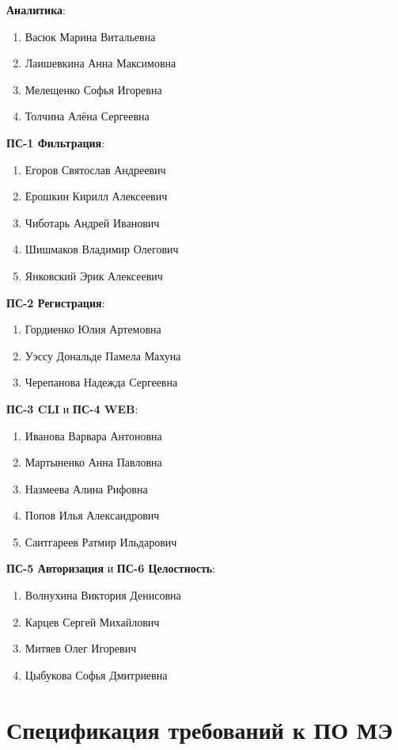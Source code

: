 \documentclass[13pt,a4paper,final]{article}
\begin{document}
	\textbf{Аналитика}:
	\begin{enumerate}
		\item Васюк Марина Витальевна
		\item Лаишевкина Анна Максимовна
		\item Мелещенко Софья Игоревна
		\item Толчина Алёна Сергеевна
	\end{enumerate}
	
	\textbf{ПС-1 Фильтрация}:
	\begin{enumerate}
		\item Егоров Святослав Андреевич
		\item Ерошкин Кирилл Алексеевич
		\item Чиботарь Андрей Иванович
		\item Шишмаков Владимир Олегович
		\item Янковский Эрик Алексеевич
	\end{enumerate}
	
	\textbf{ПС-2 Регистрация}:
	\begin{enumerate}
		\item Гордиенко Юлия Артемовна
		\item Уэссу Дональде Памела Махуна
		\item Черепанова Надежда Сергеевна
	\end{enumerate}
	
	\textbf{ПС-3 CLI} и \textbf{ПС-4 WEB}:
	\begin{enumerate}
		\item Иванова Варвара Антоновна
		\item Мартыненко Анна Павловна
		\item Назмеева Алина Рифовна
		\item Попов Илья Александрович
		\item Саитгареев Ратмир Ильдарович
	\end{enumerate}
	
	
	\textbf{ПС-5 Авторизация} и \textbf{ПС-6 Целостность}:
	\begin{enumerate}
		\item Волнухина Виктория Денисовна
		\item Карцев Сергей Михайлович
		\item Митяев Олег Игоревич
		\item Цыбукова Софья Дмитриевна
	\end{enumerate}
	
	
	\newpage
	\tableofcontents
	\newpage
	\section{Спецификация требований к ПО МЭ}
\end{document}
